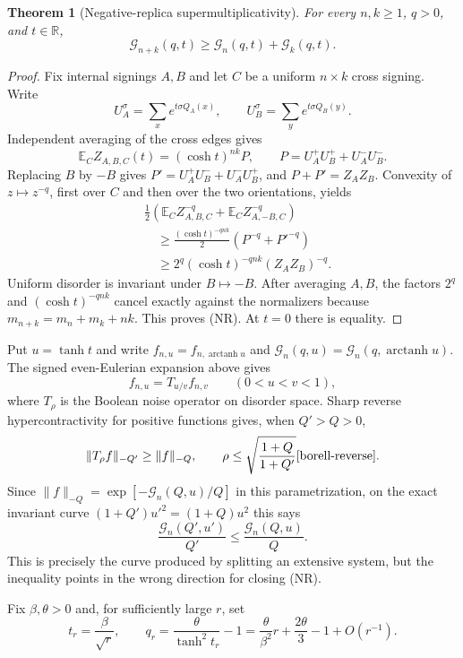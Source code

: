 \documentclass[11pt]{article}
\newtheorem{theorem}{Theorem}
\begin{document}
\begin{theorem}[Negative-replica supermultiplicativity]
\label{thm:negative-replica-super}
For every $n,k\ge1$, $q>0$, and $t\in\mathbb R$,
\[
 \mathcal G_{n+k}(q,t)\ge
 \mathcal G_n(q,t)+\mathcal G_k(q,t).
 \tag{NR}
\]
\end{theorem}

\begin{proof}
Fix internal signings $A,B$ and let $C$ be a uniform $n\times k$ cross
signing.  Write
\[
 U_A^\sigma=\sum_xe^{t\sigma Q_A(x)},\qquad
 U_B^\sigma=\sum_ye^{t\sigma Q_B(y)}.
\]
Independent averaging of the cross edges gives
\[
 \mathbb E_CZ_{A,B,C}(t)=(\cosh t)^{nk}P,\qquad
 P=U_A^+U_B^++U_A^-U_B^-.
\]
Replacing $B$ by $-B$ gives
$P'=U_A^+U_B^-+U_A^-U_B^+$, and $P+P'=Z_AZ_B$.  Convexity of
$z\mapsto z^{-q}$, first over $C$ and then over the two orientations, yields
\[
\begin{aligned}
&\frac12\left(\mathbb E_CZ_{A,B,C}^{-q}
 +\mathbb E_CZ_{A,-B,C}^{-q}\right)\\
&\quad\ge\frac{(\cosh t)^{-qnk}}2(P^{-q}+{P'}^{-q})\\
&\quad\ge2^q(\cosh t)^{-qnk}(Z_AZ_B)^{-q}.
\end{aligned}
\]
Uniform disorder is invariant under $B\mapsto-B$.  After averaging $A,B$,
the factors $2^q$ and $(\cosh t)^{-qnk}$ cancel exactly against the
normalizers because $m_{n+k}=m_n+m_k+nk$.  This proves (NR).  At $t=0$ there
is equality.
\end{proof}

Put $u=\tanh t$ and write
$f_{n,u}=f_{n,\operatorname{arctanh}u}$ and
$\mathcal G_n(q,u)=\mathcal G_n(q,\operatorname{arctanh}u)$.  The signed even-Eulerian expansion
above gives
\[
 f_{n,u}=T_{u/v}f_{n,v}\qquad(0<u<v<1),
\]
where $T_\rho$ is the Boolean noise operator on disorder space.  Sharp
reverse hypercontractivity for positive functions gives, when $Q'>Q>0$,
\[
 \|T_\rho f\|_{-Q'}\ge\|f\|_{-Q},
 \qquad \rho\le\sqrt{\frac{1+Q}{1+Q'}}
 \cite{borell-reverse}.
\]
Since $\|f\|_{-Q}=\exp[-\mathcal G_n(Q,u)/Q]$ in this parametrization, on the exact invariant curve
$(1+Q')u'^2=(1+Q)u^2$ this says
\begin{equation}
 \frac{\mathcal G_n(Q',u')}{Q'}
 \le\frac{\mathcal G_n(Q,u)}Q.
 \label{eq:reverse-transport}
\end{equation}
This is precisely the curve produced by splitting an extensive system, but
the inequality points in the wrong direction for closing (NR).

Fix $\beta,\theta>0$ and, for sufficiently large $r$, set
\[
 t_r=\frac\beta{\sqrt r},\qquad
 q_r=\frac\theta{\tanh^2t_r}-1
 =\frac\theta{\beta^2}r+\frac{2\theta}{3}-1+O(r^{-1}).
\]
\end{document}
